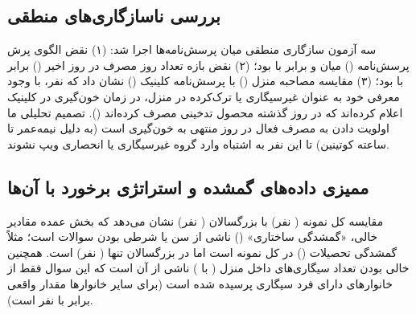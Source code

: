 \documentclass[12pt]{exam}
\begin{document}
\subsection{بررسی ناسازگاری‌های منطقی}
سه آزمون سازگاری منطقی میان پرسش‌نامه‌ها اجرا شد: (۱) نقض الگوی پرش پرسش‌نامه () میان  و  برابر با  بود؛ (۲) نقض بازه تعداد روز مصرف در  روز اخیر () برابر با  بود؛ (۳) مقایسه مصاحبه منزل () با پرسش‌نامه کلینیک () نشان داد که  نفر، با وجود معرفی خود به عنوان غیرسیگاری یا ترک‌کرده در منزل، در زمان خون‌گیری در کلینیک اعلام کرده‌اند که در  روز گذشته محصول تدخینی مصرف کرده‌اند (). تصمیم تحلیلی ما اولویت دادن به مصرف فعال در  روز منتهی به خون‌گیری است (به دلیل نیمه‌عمر  تا  ساعته کوتینین) تا این  نفر به اشتباه وارد گروه غیرسیگاری یا انحصاری ویپ نشوند.

\subsection{ممیزی داده‌های گمشده و استراتژی برخورد با آن‌ها}
مقایسه کل نمونه ( نفر) با بزرگسالان ( نفر) نشان می‌دهد که بخش عمده مقادیر خالی، «گمشدگی ساختاری» () ناشی از سن یا شرطی بودن سوالات است؛ مثلاً گمشدگی تحصیلات () در کل نمونه  است اما در بزرگسالان تنها  ( نفر) است. همچنین خالی بودن تعداد سیگاری‌های داخل منزل ( با ) ناشی از آن است که این سوال فقط از خانوارهای دارای فرد سیگاری پرسیده شده است (برای سایر خانوارها مقدار واقعی برابر با  نفر است).
\end{document}
